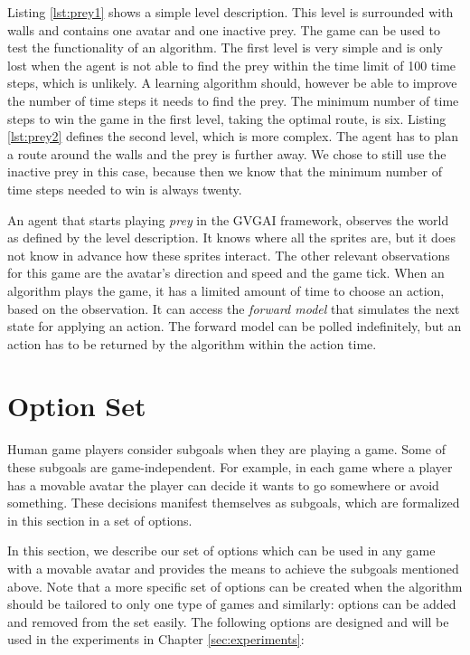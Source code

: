 Listing \ref{lst:prey1} shows a simple level description. This level is
surrounded with walls and contains one avatar and one inactive prey. 
The game can be used to test the functionality of an algorithm. The first level
is very simple and is only lost when the agent is not able to find the prey
within the time limit of 100 time steps, which is unlikely. A learning
algorithm should, however be able to improve the number of time steps it needs
to find the prey. The minimum number of time steps to win the game in the first
level, taking the optimal route, is six. Listing \ref{lst:prey2} defines the
second level, which is more complex. The agent has to plan a route around the
walls and the prey is further away. We chose to still use the inactive prey in
this case, because then we know that the minimum number of time steps needed to
win is always twenty.

An agent that starts playing \textit{prey} in the GVGAI framework, observes the
world as defined by the level description. It knows where all the sprites are,
but it does not know in advance how these sprites interact. The other relevant
observations for this game are the avatar's direction and speed and the game
tick. When an algorithm plays the game, it has a limited amount of time to
choose an action, based on the observation. It can access the \emph{forward
model} that simulates the next state for applying an action. The forward model
can be polled indefinitely, but an action has to be returned by the algorithm
within the action time.

\section{Option Set}
\label{subsec:option-set}
Human game players consider subgoals when they are playing a game. Some of these
subgoals are game-independent. For example, in each game where a player has a
movable avatar the player can decide it wants to go somewhere or avoid
something. These decisions manifest themselves as subgoals, which are formalized
in this section in a set of options.  

In this section, we describe our set of options which can be used in any game
with a movable avatar and provides the means to achieve the subgoals mentioned
above. Note that a more specific set of options can be created when the
algorithm should be tailored to only one type of games and similarly: options
can be added and removed from the set easily. The following options are
designed and will be used in the experiments in Chapter \ref{sec:experiments}:

